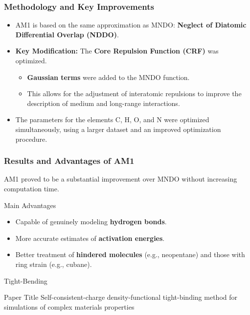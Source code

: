 \begin{frame}
  \frametitle{Methodology and Key Improvements}
  
  \begin{itemize}
    \item AM1 is based on the same approximation as MNDO: \textbf{Neglect of Diatomic Differential Overlap (NDDO)}. \pause
    \item \textbf{Key Modification:} The \textbf{Core Repulsion Function (CRF)} was optimized. \pause
    \begin{itemize}
        \item \textbf{Gaussian terms} were added to the MNDO function. \pause
        \item This allows for the adjustment of interatomic repulsions to improve the description of medium and long-range interactions. \pause
    \end{itemize}
    \item The parameters for the elements C, H, O, and N were optimized simultaneously, using a larger dataset and an improved optimization procedure.
  \end{itemize}
\end{frame}

\begin{frame}
  \frametitle{Results and Advantages of AM1}
  
  AM1 proved to be a substantial improvement over MNDO without increasing computation time. \pause
  
  \begin{alertblock}{Main Advantages}
    \begin{itemize}
      \item<2-> Capable of genuinely modeling \textbf{hydrogen bonds}. \pause
      \item<3-> More accurate estimates of \textbf{activation energies}. \pause
      \item<4-> Better treatment of \textbf{hindered molecules} (e.g., neopentane) and those with ring strain (e.g., cubane).
    \end{itemize}
  \end{alertblock}
  
\end{frame}


\begin{frame}{Tight-Bending}
	\begin{block}{Paper Title}
	Self-consistent-charge density-functional tight-binding method for simulations of complex
materials properties
	\end{block}
\end{frame}

